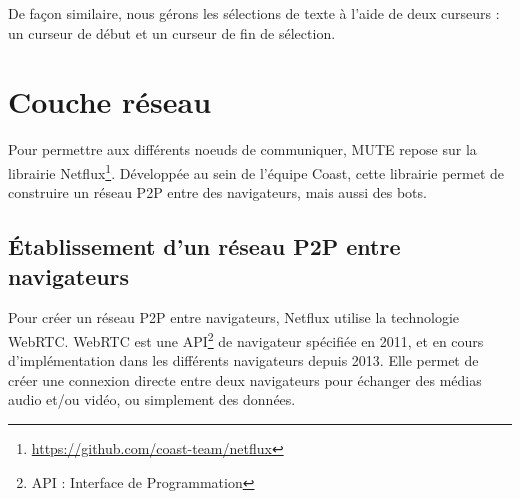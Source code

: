 De façon similaire, nous gérons les sélections de texte à l'aide de deux curseurs : un curseur de début et un curseur de fin de sélection.






\section{Couche réseau}

Pour permettre aux différents noeuds de communiquer, MUTE repose sur la librairie Netflux\footnote{\url{https://github.com/coast-team/netflux}}.
Développée au sein de l'équipe Coast, cette librairie permet de construire un réseau \ac{P2P} entre des navigateurs, mais aussi des bots.

\subsection{Établissement d'un réseau \ac{P2P} entre navigateurs}

Pour créer un réseau \ac{P2P} entre navigateurs, Netflux utilise la technologie \acf{WebRTC}.
\ac{WebRTC} est une API\footnote{\ac{API} : Interface de Programmation} de navigateur spécifiée en 2011, et en cours d'implémentation dans les différents navigateurs depuis 2013.
Elle permet de créer une connexion directe entre deux navigateurs pour échanger des médias audio et/ou vidéo, ou simplement des données.


